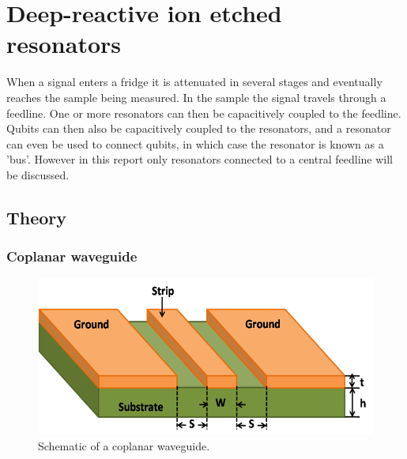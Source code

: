 \label{part:DRIE}











\part{Deep-reactive ion etched resonators}
\label{chapter:Resonators}


When a signal enters a fridge it is attenuated in several stages and eventually reaches the sample being measured. In the sample the signal travels through a feedline. One or more resonators can then be capacitively coupled to the feedline. Qubits can then also be capacitively coupled to the resonators, and a resonator can even be used to connect qubits, in which case the resonator is known as a 'bus'. However in this report only resonators connected to a central feedline will be discussed.







\chapter{Theory}
  \label{ch:theory}

  \section{Coplanar waveguide}

    \begin{figure}
        \begin{center}
            \includegraphics[width=\textwidth]{Figures/DRIE/CPW.png}
        \end{center}
        \caption{Schematic of a coplanar waveguide.}
        \label{fig:CPW}
    \end{figure}

